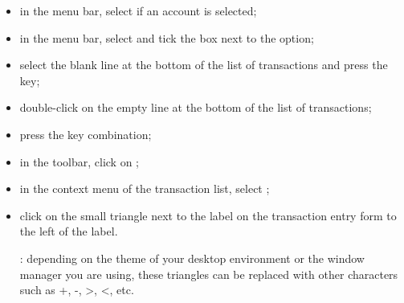 \begin{itemize}
	\item in the menu bar, select  if an account is selected;
	\item in the menu bar, select  and tick the box next to the  option;
	\item select the blank line at the bottom of the list of transactions and press the  key;
	\item double-click on the empty line at the bottom of the list of transactions;
	\item press the  key combination;
	\item in the toolbar, click on ;
	\item in the context menu of the transaction list, select ;
	\item click on the small triangle next to the label  on the transaction entry form to the left of the label.
	
	\Note{}: depending on the theme of your desktop environment or the window manager you are using, these triangles can be replaced with other characters such as +, -, >, <, etc.
\end{itemize}

